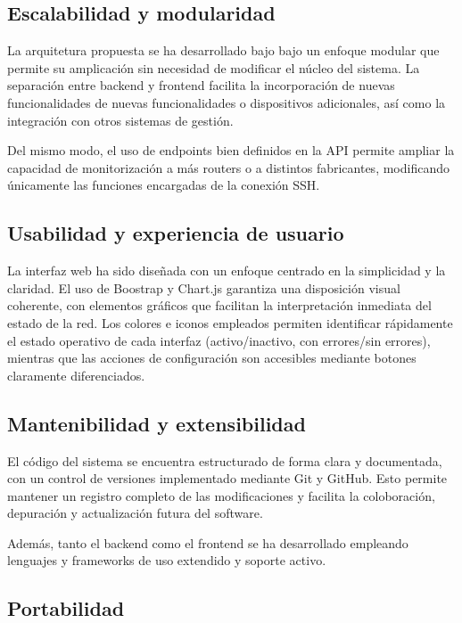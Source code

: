 \subsection*{Escalabilidad y modularidad}

La arquitetura propuesta se ha desarrollado bajo bajo un enfoque modular que permite su amplicación sin necesidad de modificar el núcleo del sistema. La separación entre backend y frontend facilita la incorporación de nuevas funcionalidades de nuevas funcionalidades o dispositivos adicionales, así como la integración con otros sistemas de gestión.

Del mismo modo, el uso de endpoints bien definidos en la API permite ampliar la capacidad de monitorización a más routers o a distintos fabricantes, modificando únicamente las funciones encargadas de la conexión SSH.

\subsection*{Usabilidad y experiencia de usuario}

La interfaz web ha sido diseñada con un enfoque centrado en la simplicidad y la claridad. El uso de Boostrap y Chart.js garantiza una disposición visual coherente, con elementos gráficos que facilitan la interpretación inmediata del estado de la red. Los colores e iconos empleados permiten identificar rápidamente el estado operativo de cada interfaz (activo/inactivo, con errores/sin errores), mientras que las acciones de configuración son accesibles mediante botones claramente diferenciados.

\subsection*{Mantenibilidad y extensibilidad}

El código del sistema se encuentra estructurado de forma clara y documentada, con un control de versiones implementado mediante Git y GitHub. Esto permite mantener un registro completo de las modificaciones y facilita la coloboración, depuración y actualización futura del software.

Además, tanto el backend como el frontend se ha desarrollado empleando lenguajes y frameworks de uso extendido y soporte activo.

\subsection*{Portabilidad}

